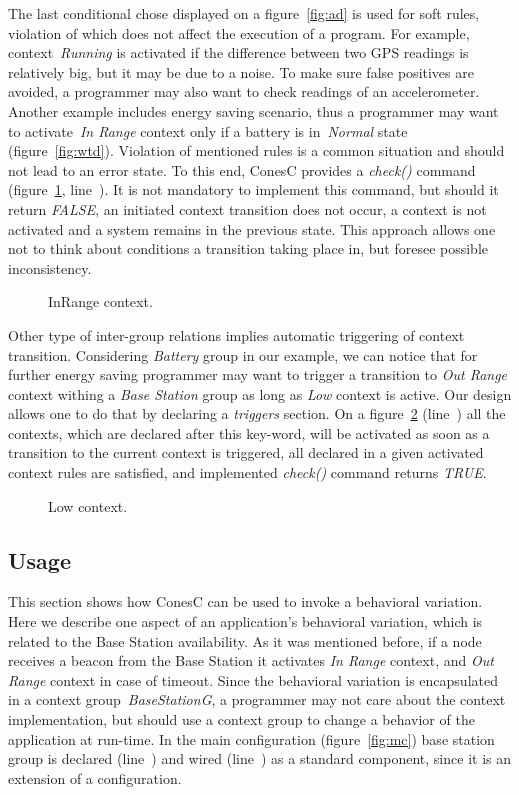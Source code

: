 The last conditional chose displayed on a figure~\ref{fig:ad} is used for soft rules, violation of
which does not affect the execution of a program. For example, context~\emph{Running} is
activated if the difference between two GPS readings is relatively big, but it may be due to a noise.
To make sure false positives are avoided, a programmer may also want to check
readings of an accelerometer. Another example includes energy saving scenario,
thus a programmer may want to activate~\emph{In Range} context only if a battery is
in~\emph{Normal} state (figure~\ref{fig:wtd}).
Violation of mentioned rules is a common situation and should not lead to an error state.
To this end, ConesC provides a \emph{check()} command
(figure~\ref{fig:irc}, line~). It is not mandatory to implement this command, but
should it return \emph{FALSE}, an initiated context transition does not occur,
a context is not activated and a system remains in the previous state.
This approach allows one not to think about conditions a transition taking
place in, but foresee possible inconsistency.


\begin{figure}[!h]
\TheSbox
\caption{InRange context.}
\label{fig:irc}
\end{figure}

Other type of inter-group relations implies automatic triggering of context
transition. Considering \emph{Battery} group in our example, we can notice that
for further energy saving programmer may want to trigger a transition to
\emph{Out Range} context withing a \emph{Base Station} group as long as
\emph{Low} context is active. Our design allows one to do that by declaring a
\emph{triggers} section. On a figure~\ref{fig:lc} (line~) all
the contexts, which are declared after this key-word, will be activated as soon as a
transition to the current context is triggered, all declared in a given activated context rules are
satisfied, and implemented \emph{check()} command returns \emph{TRUE}.


\begin{figure}[!h]
\TheSbox
\caption{Low context.}
\label{fig:lc}
\end{figure}

\subsection{Usage}

This section shows how ConesC can be used to invoke a behavioral
variation. Here we describe one aspect of an application's behavioral variation,
which is related to the Base Station availability. As it was mentioned before,
if a node receives a beacon from the Base Station it activates \emph{In Range}
context, and \emph{Out Range} context in case of timeout.
Since the behavioral variation is encapsulated in a context group~\emph{BaseStationG},
a programmer may not care about the context implementation, but should use a context group
to change a behavior of the application at run-time. In the main
configuration (figure~\ref{fig:mc}) base station group is declared
(line~) and wired (line~) as a standard
component, since it is an extension of a configuration.

